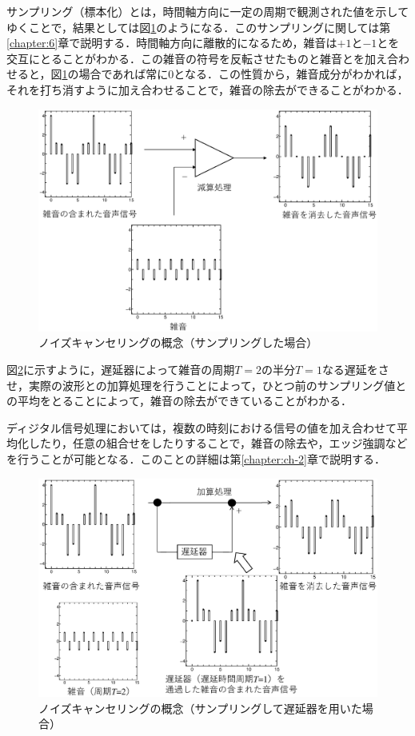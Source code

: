 %
サンプリング（標本化）とは，時間軸方向に一定の周期で観測された値を示してゆくことで，結果としては図\ref{fig:00-03}のようになる．このサンプリングに関しては第\ref{chapter:6}章で説明する．時間軸方向に離散的になるため，雑音は$+1$と$-1$とを交互にとることがわかる．この雑音の符号を反転させたものと雑音とを加え合わせると，図\ref{fig:00-03}の場合であれば常に0となる．この性質から，雑音成分がわかれば，それを打ち消すように加え合わせることで，雑音の除去ができることがわかる．

\begin{figure}[t]
\begin{center}
\includegraphics[width=.85\textwidth]{fig/zu-01-03.eps}
\end{center}
\caption{ノイズキャンセリングの概念（サンプリングした場合）}
\label{fig:00-03}
\end{figure}

図\ref{fig:00-04}に示すように，遅延器によって雑音の周期$T=2$の半分$T=1$なる遅延をさせ，実際の波形との加算処理を行うことによって，ひとつ前のサンプリング値との平均をとることによって，雑音の除去ができていることがわかる．

ディジタル信号処理においては，複数の時刻における信号の値を加え合わせて平均化したり，任意の組合せをしたりすることで，雑音の除去や，エッジ強調などを行うことが可能となる．このことの詳細は第\ref{chapter:ch-2}章で説明する．


\begin{figure}[H]
\begin{center}
\includegraphics[width=.85\textwidth]{fig/zu-01-04.eps}
\end{center}
\caption{ノイズキャンセリングの概念（サンプリングして遅延器を用いた場合）}
\label{fig:00-04}
\end{figure}


